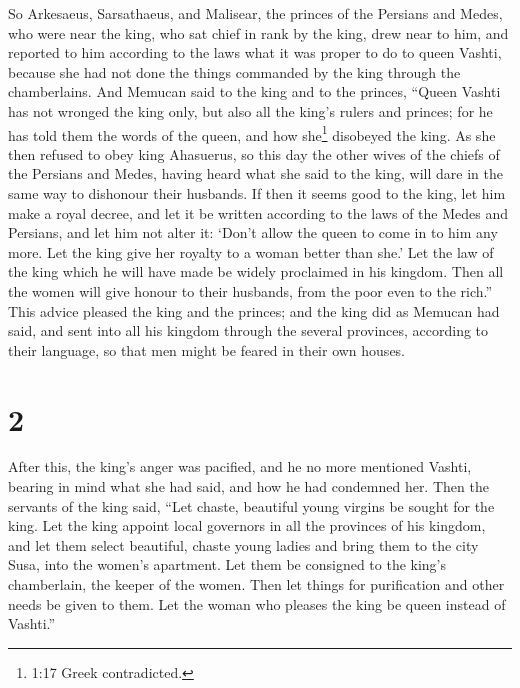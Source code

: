  So Arkesaeus, Sarsathaeus, and Malisear, the princes of
the Persians and Medes, who were near the king, who sat chief in rank by
the king, drew near to him,  and reported to him according
to the laws what it was proper to do to queen Vashti, because she had
not done the things commanded by the king through the chamberlains.
 And Memucan said to the king and to the princes, ``Queen
Vashti has not wronged the king only, but also all the king's rulers and
princes;  for he has told them the words of the queen, and
how she\footnote{1:17 Greek contradicted.} disobeyed the king. As she
then refused to obey king Ahasuerus,  so this day the other
wives of the chiefs of the Persians and Medes, having heard what she
said to the king, will dare in the same way to dishonour their husbands.
 If then it seems good to the king, let him make a royal
decree, and let it be written according to the laws of the Medes and
Persians, and let him not alter it: `Don't allow the queen to come in to
him any more. Let the king give her royalty to a woman better than she.'
 Let the law of the king which he will have made be widely
proclaimed in his kingdom. Then all the women will give honour to their
husbands, from the poor even to the rich.''  This advice
pleased the king and the princes; and the king did as Memucan had said,
 and sent into all his kingdom through the several
provinces, according to their language, so that men might be feared in
their own houses.

\hypertarget{section-1}{%
\section{2}\label{section-1}}

 After this, the king's anger was pacified, and he no more
mentioned Vashti, bearing in mind what she had said, and how he had
condemned her.  Then the servants of the king said, ``Let
chaste, beautiful young virgins be sought for the king.  Let
the king appoint local governors in all the provinces of his kingdom,
and let them select beautiful, chaste young ladies and bring them to the
city Susa, into the women's apartment. Let them be consigned to the
king's chamberlain, the keeper of the women. Then let things for
purification and other needs be given to them.  Let the
woman who pleases the king be queen instead of Vashti.''

